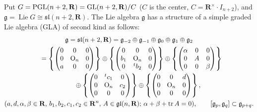\documentclass[pdftex]{sigma}
\begin{document}
Put $G={\rm PGL}(n+2,{\mathbf{R}})={\rm GL}(n+2,{\mathbf{R}})/C$ ($C$ is the center,
$C=\mathbf{R}^{\times}\cdot I_{n+2}$),
and $\mathfrak{g}=\operatorname{Lie} G \cong \mathfrak{sl}(n+2,{\mathbf{R}})$.
The Lie algebra $\mathfrak{g}$ has a structure of
a simple graded Lie algebra (GLA) of second kind as follows:
\begin{gather*}
       {\mathfrak g} = {\mathfrak{sl}}(n+2,{\mathbf{R}})  = {\mathfrak g}_{-2}\oplus {\mathfrak g}_{-1} \oplus
                    {\mathfrak g}_0
                    \oplus {\mathfrak g}_1 \oplus {\mathfrak g}_2 \\
\hphantom{{\mathfrak g}}{}
= \left\{{\begin{pmatrix}
                       0 & 0 & 0 \\
                       0 & \mathrm{O}_n & 0 \\
                       a & 0 & 0
                    \end{pmatrix}}\right\}
                       \oplus
                    \left\{{\begin{pmatrix}
                       0 & 0 & 0 \\
                       b_1 & \mathrm{O}_n & 0 \\
                       0 & {}^tb_2 & 0
                    \end{pmatrix}}\right\}
                       \oplus
                    \left\{{\begin{pmatrix}
                       \alpha & 0 & 0 \\
                       0 & A & 0 \\
                       0 & 0 &\beta
                    \end{pmatrix}}\right\} \\
\hphantom{{\mathfrak g}=}{} \quad {}\oplus
                    \left\{{\begin{pmatrix}
                       0 & {}^tc_1 & 0 \\
                       0 & \mathrm{O}_n & c_2 \\
                       0 & 0 & 0
                    \end{pmatrix}}\right\}
                       \oplus
                    \left\{{\begin{pmatrix}
                       0 & 0 & d \\
                       0 & \mathrm{O}_n & 0 \\
                       0 & 0 & 0
                     \end{pmatrix}}\right\}, \\
  (a,d,\alpha,\beta \in {\mathbf R},\,  b_1,b_2,c_1,c_2\in
                    {\mathbf R}^n, \, A\in \mathfrak{gl}(n,{\mathbf{R}}); \,
                    \alpha +\beta +\operatorname{tr}A=0),
                  \qquad [\mathfrak{g}_p,\mathfrak{g}_q] \subset
                    \mathfrak{g}_{p+q}.
\end{gather*}
\end{document}
